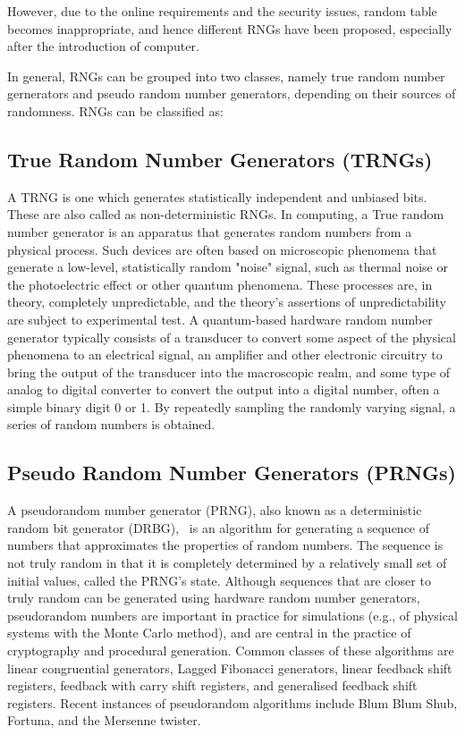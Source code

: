 However, due to the online requirements and the security issues, random table becomes inappropriate, and hence different RNGs have been proposed, especially after the introduction of computer.

In general, RNGs can be grouped into two classes, namely true random number gernerators and pseudo random number generators, depending on their sources of randomness. 
RNGs can be classified as:
\subsection{True Random Number Generators (TRNGs)}
A TRNG is one which generates statistically independent and unbiased bits. These are also
called as non-deterministic RNGs. In computing, a True random number generator is an apparatus that generates random numbers from a physical process. Such devices are often based on microscopic phenomena that generate a low-level, statistically random "noise" signal, such as thermal noise or the photoelectric effect or other quantum phenomena. These processes are, in theory, completely unpredictable, and the theory's assertions of unpredictability are subject to experimental test. A quantum-based hardware random number generator typically consists of a transducer to convert some aspect of the physical phenomena to an electrical signal, an amplifier and other electronic circuitry to bring the output of the transducer into the macroscopic realm, and some type of analog to digital converter to convert the output into a digital number, often a simple binary digit 0 or 1. By repeatedly sampling the randomly varying signal, a series of random numbers is obtained.

\subsection{Pseudo Random Number Generators (PRNGs)}
A pseudorandom number generator (PRNG), also known as a deterministic random bit generator (DRBG),~\cite{Barker05recommendationfor} is an algorithm for generating a sequence of numbers that approximates the properties of random numbers. The sequence is not truly random in that it is completely determined by a relatively small set of initial values, called the PRNG's state. Although sequences that are closer to truly random can be generated using hardware random number generators, pseudorandom numbers are important in practice for simulations (e.g., of physical systems with the Monte Carlo method), and are central in the practice of cryptography and procedural generation. Common classes of these algorithms are linear congruential generators, Lagged Fibonacci generators, linear feedback shift registers, feedback with carry shift registers, and generalised feedback shift registers. Recent instances of pseudorandom algorithms include Blum Blum Shub, Fortuna, and the Mersenne twister.


